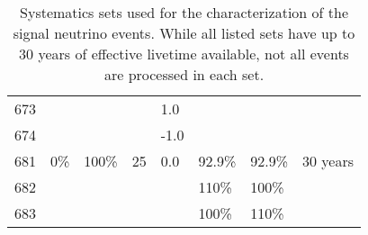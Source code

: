 \begin{landscape}
\begin{table}[]
\begin{tabular}{@{}llllllll@{}}
673        &                     &         &          & 1.0           &            &            &          \\
674        &                     &         &          & -1.0          &            &            &          \\ \midrule
681        & 0\%                 & 100\%   & 25       & 0.0           & 92.9\%     & 92.9\%     & 30 years \\
682        &                     &         &          &               & 110\%      & 100\%      &          \\
683        &                     &         &          &               & 100\%      & 110\%      &         
\end{tabular}
\caption{Systematics sets used for the characterization of the signal neutrino events. While all listed sets have up to 30 years of effective livetime available, not all events are processed in each set.}
\label{table:geniesets}
\end{table}
\end{landscape}


